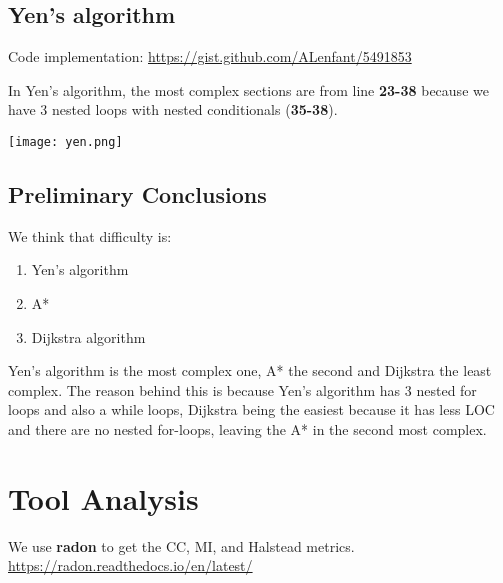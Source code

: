 \pagebreak

\subsection{Yen's algorithm}
Code implementation: \newline
\url{https://gist.github.com/ALenfant/5491853} \newline\newline

\noindent
In Yen's algorithm, the most complex sections are from line \textbf{23-38} because we have 3 nested loops with nested conditionals (\textbf{35-38}).

\begin{center}
    \texttt{[image: yen.png]}    
\end{center}

\subsection{Preliminary Conclusions}
We think that difficulty is:
\begin{enumerate}
    \item Yen's algorithm
    \item A*
    \item Dijkstra algorithm
\end{enumerate}

Yen's algorithm is the most complex one, A* the second and Dijkstra the least complex. The reason behind this is because Yen's algorithm has 3 nested for loops and also a while loops, Dijkstra being the easiest because it has less LOC and there are no nested for-loops, leaving the A* in the second most complex.

\pagebreak

\section{Tool Analysis}

We use \textbf{radon} to get the CC, MI, and Halstead metrics. \newline\newline
\url{https://radon.readthedocs.io/en/latest/}

